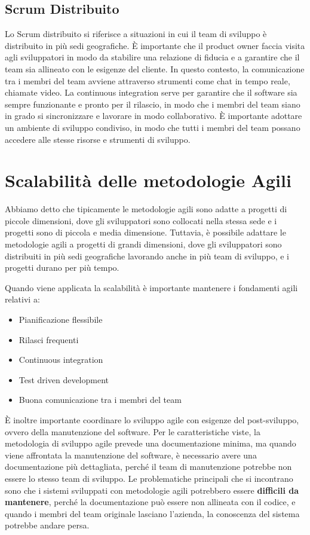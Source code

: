 \subsection{Scrum Distribuito}
Lo Scrum distribuito si riferisce a situazioni in cui il team di sviluppo è distribuito
in più sedi geografiche.
È importante che il product owner faccia visita agli sviluppatori in modo da stabilire 
una relazione di fiducia e a garantire che il team sia allineato con le esigenze del cliente.
In questo contesto, la comunicazione tra i membri del team avviene attraverso strumenti
come chat in tempo reale, chiamate video.
La continuous integration serve per garantire che il software sia sempre funzionante 
e pronto per il rilascio, in modo che i membri del team siano in grado si sincronizzare
e lavorare in modo collaborativo.
È importante adottare un ambiente di sviluppo condiviso, in modo che tutti i membri del team
possano accedere alle stesse risorse e strumenti di sviluppo.
\section{Scalabilità delle metodologie Agili}
Abbiamo detto che tipicamente le metodologie agili sono adatte a progetti di piccole
dimensioni, dove gli sviluppatori sono collocati nella stessa sede e i progetti sono 
di piccola e media dimensione. Tuttavia, è possibile adattare le metodologie agili
a progetti di grandi dimensioni, dove gli sviluppatori sono distribuiti in più sedi
geografiche lavorando anche in più team di sviluppo, e i progetti durano per più tempo.

Quando viene applicata la scalabilità è importante mantenere i fondamenti agili relativi a:
\begin{itemize}
    \item Pianificazione flessibile
    \item Rilasci frequenti
    \item Continuous integration
    \item Test driven development
    \item Buona comunicazione tra i membri del team
\end{itemize}
È inoltre importante coordinare lo sviluppo agile con esigenze del post-sviluppo, ovvero 
della manutenzione del software. Per le caratteristiche viste, la metodologia di sviluppo 
agile prevede una documentazione minima, ma quando viene affrontata la manutenzione del
software, è necessario avere una documentazione più dettagliata, perché il team di manutenzione
potrebbe non essere lo stesso team di sviluppo. Le problematiche principali che si incontrano
sono che i sistemi sviluppati con metodologie agili potrebbero essere \textbf{difficili da
mantenere},
perché la documentazione può essere non allineata con il codice, e quando i membri 
del team originale lasciano l'azienda, la conoscenza del sistema potrebbe andare persa.
